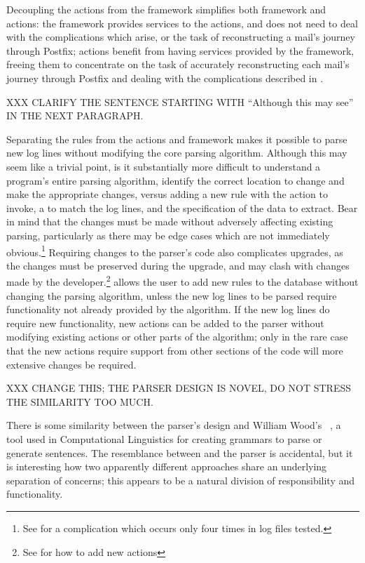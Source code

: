 Decoupling the actions from the framework simplifies both framework and
actions: the framework provides services to the actions, and does not need
to deal with the complications which arise, or the task of reconstructing a
mail's journey through Postfix; actions benefit from having services
provided by the framework, freeing them to concentrate on the task of
accurately reconstructing each mail's journey through Postfix and dealing
with the complications described in .

XXX CLARIFY THE SENTENCE STARTING WITH ``Although this may see'' IN THE
NEXT PARAGRAPH\@.

Separating the rules from the actions and framework makes it possible to
parse new log lines without modifying the core parsing algorithm.  Although
this may seem like a trivial point, is it substantially more difficult to
understand a program's entire parsing algorithm, identify the correct
location to change and make the appropriate changes, versus adding a new
rule with the action to invoke, a \regex{} to match the log lines, and the
specification of the data to extract.  Bear in mind that the changes must
be made without adversely affecting existing parsing, particularly as there
may be edge cases which are not immediately obvious.\footnote{See
 for a complication which
occurs only four times in \numberOFlogFILES{} log files tested.}  Requiring
changes to the parser's code also complicates upgrades, as the changes
must be preserved during the upgrade, and may clash with changes made by
the developer.\footnote{See  for how to add
new actions}  \parsername{} allows the user to add new rules to the
database without changing the parsing algorithm, unless the new log lines
to be parsed require functionality not already provided by the algorithm.
If the new log lines do require new functionality, new actions can be added
to the parser without modifying existing actions or other parts of the
algorithm; only in the rare case that the new actions require support from
other sections of the code will more extensive changes be required.

XXX CHANGE THIS\@; THE PARSER DESIGN IS NOVEL, DO NOT STRESS THE SIMILARITY
TOO MUCH\@.

There is some similarity between the parser's design and William Wood's
\ATN{}~\cite{atns, nlpip}, a tool used in Computational Linguistics for
creating grammars to parse or generate sentences.  The resemblance between
\ATN{} and the parser is accidental, but it is interesting how two
apparently different approaches share an underlying separation of concerns;
this appears to be a natural division of responsibility and functionality.

